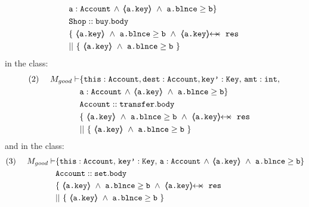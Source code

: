 \begin{proofO}
\begin{align*}
		& \prg{a}:\prg{Account}\, \wedge\, {\inside{\prg{a.key}}}\ \wedge\ {\prg{a.blnce} \geq \prg{b}}\} \\
		& \prg{Shop}::\prg{buy}.\prg{body}\ \\ 
		& \{\ {\inside{\prg{a.key}}\ \wedge\ {\prg{a.blnce} \geq \prg{b}}}\ 
		\wedge\ {\protectedFrom{\prg{a.key}}{\prg{res}}}\ \\
		& ||\ \{\ {\inside{\prg{a.key}}\ \wedge\ 
							 {\prg{a.blnce} \geq \prg{b}}}\ \}
\end{align*}
\normalsize
{} in the  class:
\small
\begin{align*}
\text{(2)}  \ \ \ \ M_{good} \vdash 
		&	\{  \prg{this}:\prg{Account}, \prg{dest} : \prg{Account}, 
			\prg{key'} : \prg{Key},\, \prg{amt}:\prg{int},\, \\
			& \prg{a}:\prg{Account}\, \wedge\, {\inside{\prg{a.key}}}\ 
			\wedge\ {\prg{a.blnce} \geq \prg{b}}\} \\
		& \prg{Account}::\prg{transfer}.\prg{body}\ \\ 
		& \{\ {\inside{\prg{a.key}}\ \wedge\ {\prg{a.blnce} \geq \prg{b}}}\ 
		\wedge\ {\protectedFrom{\prg{a.key}}{\prg{res}}}\ \\
		& ||\ \{\ {\inside{\prg{a.key}}\ \wedge\ 
							 {\prg{a.blnce} \geq \prg{b}}}\ \}
\end{align*}
\normalsize
and \prg{set} in the \prg{Account} class:
\small
\begin{align*}
\text{(3)}  \ \ \ \ M_{good} \vdash 
		&	\{  \prg{this}:\prg{Account},\,
			\prg{key'} : \prg{Key},\, \prg{a}:\prg{Account}\, \wedge\, {\inside{\prg{a.key}}}\ 
			\wedge\ {\prg{a.blnce} \geq \prg{b}}\} \\
		& \prg{Account}::\prg{set}.\prg{body}\ \\ 
		& \{\ {\inside{\prg{a.key}}\ \wedge\ {\prg{a.blnce} \geq \prg{b}}}\ 
		\wedge\ {\protectedFrom{\prg{a.key}}{\prg{res}}}\ \\
		& ||\ \{\ {\inside{\prg{a.key}}\ \wedge\ 
							 {\prg{a.blnce} \geq \prg{b}}}\ \}
\end{align*}
\normalsize


\end{proofO}
